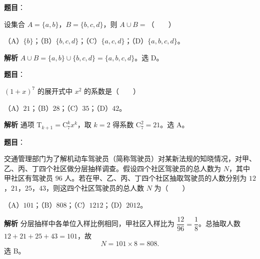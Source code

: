 
\begin{answer}

\textbf{题目}：

设集合 $A=\{a,b\}$，$B=\{b,c,d\}$，则 $A\cup B=$\mbox{（　　）}

（A）$\{b\}$；（B）$\{b,c,d\}$；（C）$\{a,c,d\}$；（D）$\{a,b,c,d\}$。

\textbf{解析}
$A\cup B=\{a,b\}\cup\{b,c,d\}=\{a,b,c,d\}$。选 D。


\end{answer}
\begin{answer}

\textbf{题目}：

$(1+x)^7$ 的展开式中 $x^2$ 的系数是\mbox{（　　）}

（A）$21$；（B）$28$；（C）$35$；（D）$42$。

\textbf{解析}
通项 $\mathrm T_{k+1}=\mathrm C_7^kx^k$，取 $k=2$ 得系数 $\mathrm C_7^2=21$。选 A。


\end{answer}
\begin{answer}

\textbf{题目}：

交通管理部门为了解机动车驾驶员（简称驾驶员）对某新法规的知晓情况，对甲、乙、丙、丁四个社区做分层抽样调查。假设四个社区驾驶员的总人数为 $N$，其中甲社区有驾驶员 $96$ 人。若在甲、乙、丙、丁四个社区抽取驾驶员的人数分别为 $12$，$21$，$25$，$43$，则这四个社区驾驶员的总人数 $N$ 为\mbox{（　　）}

（A）$101$；（B）$808$；（C）$1212$；（D）$2012$。

\textbf{解析}
分层抽样中各单位入样比例相同，甲社区入样比为 $\dfrac{12}{96}=\dfrac18$。总抽取人数 $12+21+25+43=101$，故
\nopagebreak[4]
\[N=101\times8=808.\]
选 B。


\end{answer}
